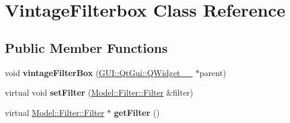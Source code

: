 \hypertarget{classGUI_1_1VintageFilterbox}{}\section{Vintage\+Filterbox Class Reference}
\label{classGUI_1_1VintageFilterbox}
\subsection*{Public Member Functions}
\begin{DoxyCompactItemize}
\item 
\hypertarget{classGUI_1_1VintageFilterbox_a35685a92c57fdbf2e84a9fe713b37b68}{}void {\bfseries vintage\+Filter\+Box} (\hyperlink{classGUI_1_1QtGui_1_1QWidget____10}{G\+U\+I\+::\+Qt\+Gui\+::\+Q\+Widget\+\_\+\+\_} $\ast$parent)\label{classGUI_1_1VintageFilterbox_a35685a92c57fdbf2e84a9fe713b37b68}

\item 
\hypertarget{classGUI_1_1VintageFilterbox_ad7c0ee00fe3faac7942d75eec2a5342b}{}virtual void {\bfseries set\+Filter} (\hyperlink{classModel_1_1Filter_1_1Filter}{Model\+::\+Filter\+::\+Filter} \&filter)\label{classGUI_1_1VintageFilterbox_ad7c0ee00fe3faac7942d75eec2a5342b}

\item 
\hypertarget{classGUI_1_1VintageFilterbox_acef2029a93f4ab3a538cdb643b9c2613}{}virtual \hyperlink{classModel_1_1Filter_1_1Filter}{Model\+::\+Filter\+::\+Filter} $\ast$ {\bfseries get\+Filter} ()\label{classGUI_1_1VintageFilterbox_acef2029a93f4ab3a538cdb643b9c2613}

\end{DoxyCompactItemize}
